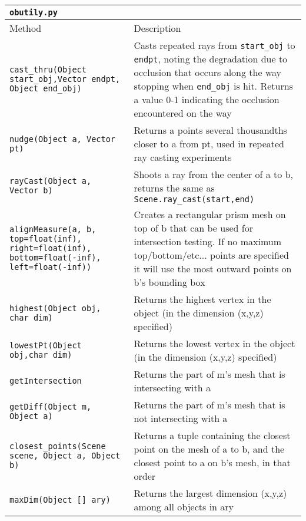 
\begin{longtable}{|p{5cm}|p{10cm}|}
	\cline{0-0}
	\small
	\texttt{obutily.py}  \\\hline
	Method & Description \\\hline
	
	\texttt{cast\_thru(Object start\_obj,Vector endpt, Object end\_obj)}
	&Casts repeated rays from \texttt{start\_obj} to \texttt{endpt}, noting the degradation due to occlusion that occurs along the way stopping when \texttt{end\_obj} is hit. Returns a value 0-1 indicating the occlusion encountered on the way \\\hline
	
	\texttt{nudge(Object a, Vector pt)} & Returns a points several thousandths closer to a from pt, used in repeated ray casting experiments \\\hline
	
	\texttt{rayCast(Object a, Vector b)} & Shoots a ray from the center of a to b, returns the same as \texttt{Scene.ray\_cast(start,end)} \\\hline
	
	\texttt{alignMeasure(a, b, top=float(inf), right=float(inf),
	bottom=float(-inf), left=float(-inf))} & Creates a rectangular prism mesh on top of b that can be used for intersection testing. If no maximum top/bottom/etc... points are specified it will use the most outward points on b's bounding box \\\hline	
	
	\texttt{highest(Object obj, char dim)} & Returns the highest vertex in the object (in the dimension (x,y,z) specified) \\\hline
	
	\texttt{lowestPt(Object obj,char dim)} & Returns the lowest vertex in the object (in the dimension (x,y,z) specified) \\\hline
	
	\texttt{getIntersection} & Returns the part of m's mesh that is intersecting with a \\\hline
	
	\texttt{getDiff(Object m, Object a)} & Returns the part of m's mesh that is not intersecting with a \\\hline
	
	\texttt{closest\_points(Scene scene, Object a, Object b)} & Returns a tuple containing the closest point on the mesh of a to b, and the closest point to a on b's mesh, in that order \\\hline
	
	\texttt{maxDim(Object [] ary)} & Returns the largest dimension (x,y,z) among all objects in ary \\\hline
	

\end{longtable}
